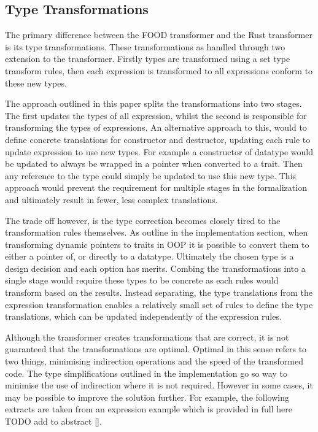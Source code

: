 \documentclass[ oneside,%
                    author={James Elgar},
                    degree={MEng},
                     title={Bidirectional transformer between functional and \\ object-oriented programming in Rust},
                  subtitle={}]{dissertation}
\begin{document}
\subsection{Type Transformations}

The primary difference between the FOOD transformer and the Rust transformer is its type transformations. These transformations as handled through two extension to the transformer. Firstly types are transformed using a set type transform rules, then each expression is transformed to all expressions conform to these new types.

The approach outlined in this paper splits the transformations into two stages. The first updates the types of all expression, whilst the second is responsible for transforming the types of expressions. An alternative approach to this, would to define concrete translations for constructor and destructor, updating each rule to update expression to use new types. 
For example a constructor of datatype would be updated to always be wrapped in a pointer when converted to a trait. Then any reference to the type could simply be updated to use this new type.
This approach would prevent the requirement for multiple stages in the formalization and ultimately result in fewer, less complex translations. 

The trade off however, is the type correction becomes closely tired to the transformation rules themselves. As outline in the implementation section, when transforming dynamic pointers to traits in OOP it is possible to convert them to either a pointer of, or directly to a datatype. Ultimately the chosen type is a design decision and each option has merits.
Combing the transformations into a single stage would require these types to be concrete as each rules would transform based on the results. Instead separating, the type translations from the expression transformation enables a relatively small set of rules to define the type translations, which can be updated independently of the expression rules.

Although the transformer creates transformations that are correct, it is not guaranteed that the transformations are optimal. Optimal in this sense refers to two things, minimising indirection operations and the speed of the transformed code. The type simplifications outlined in the implementation go so way to minimise the use of indirection where it is not required. However in some cases, it may be possible to improve the solution further. For example, the following extracts are taken from an expression example which is provided in full here TODO add to abstract \autoref{}. 
\end{document}
